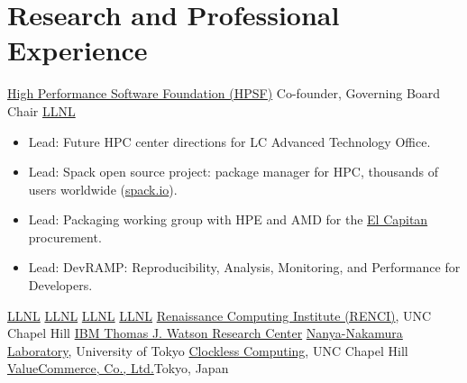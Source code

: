 \section{Research and Professional Experience}
                {\href{https://hpsf.io}{High Performance Software Foundation (HPSF)}}
                {Co-founder, Governing Board Chair}{}{}{}
		{\href{http://www.llnl.gov}{LLNL}}{}
		{
                  \begin{itemize}
                  \item Lead: Future HPC center directions for LC Advanced Technology Office.
                  \item Lead: Spack open source project: package manager for HPC, thousands of users worldwide (\href{https://spack.io}{spack.io}).
                  \item Lead: Packaging working group with HPE and AMD for the \href{https://www.llnl.gov/news/llnl-and-hpe-partner-amd-el-capitan-projected-worlds-fastest-supercomputer}{El Capitan} procurement.
                  \item Lead: DevRAMP: Reproducibility, Analysis, Monitoring, and Performance for Developers.
                \end{itemize}
                }
		{\href{http://www.llnl.gov}{LLNL}}{}{}
		{\href{http://www.llnl.gov}{LLNL}}{}{}
		{\href{http://www.llnl.gov}{LLNL}}{}{}
		{\href{http://www.llnl.gov}{LLNL}}{}{}
		{\href{http://www.renci.org}{Renaissance Computing Institute (RENCI)}, UNC Chapel Hill}{}{}{}
		{\href{http://www.watson.ibm.com}{IBM Thomas J. Watson Research Center}}{}{}{}
		{\href{http://www.hal.rcast.u-tokyo.ac.jp/}{Nanya-Nakamura Laboratory}, University of Tokyo}{}{}{}
		{\href{http://www.cs.unc.edu/~montek/}{Clockless Computing}, UNC Chapel Hill}{}{}{}
		{\href{http://valuecommerce.com}{ValueCommerce, Co., Ltd.}}{Tokyo, Japan}{}{}
